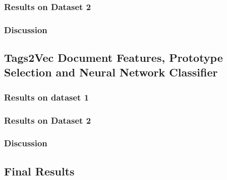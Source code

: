 \subsubsection{Results on Dataset 2}

\subsubsection{Discussion}

\subsection{Tags2Vec Document Features, Prototype Selection and Neural Network Classifier}

\subsubsection{Results on dataset 1}

\subsubsection{Results on Dataset 2}

\subsubsection{Discussion}

\subsection{Final Results}

